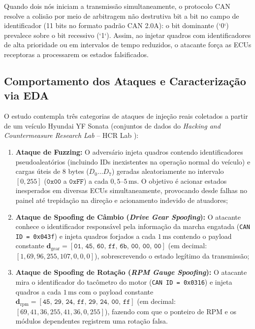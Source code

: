\documentclass[conference]{IEEEtran}
\begin{document}
Quando dois nós iniciam a transmissão simultaneamente, o protocolo CAN resolve a colisão por meio de arbitragem não destrutiva bit a bit no campo de identificador (11 bits no formato padrão CAN 2.0A): o bit dominante (`0`) prevalece sobre o bit recessivo (`1`). Assim, ao injetar quadros com identificadores de alta prioridade ou em intervalos de tempo reduzidos, o atacante força as ECUs receptoras a processarem os estados falsificados.

\subsection{Comportamento dos Ataques e Caracterização via EDA}
O estudo contempla três categorias de ataques de injeção reais coletados a partir de um veículo Hyundai YF Sonata (conjuntos de dados do \textit{Hacking and Countermeasure Research Lab} -- HCR Lab \cite{seo2018gids}):

\begin{enumerate}
    \item \textbf{Ataque de Fuzzing:} O adversário injeta quadros contendo identificadores pseudoaleatórios (incluindo IDs inexistentes na operação normal do veículo) e cargas úteis de 8 bytes ($D_0 \dots D_7$) geradas aleatoriamente no intervalo $[0, 255]$ ($\texttt{0x00}$ a $\texttt{0xFF}$) a cada $0{,}5\text{--}5\,\text{ms}$. O objetivo é acionar estados inesperados em diversas ECUs simultaneamente, provocando desde falhas no painel até trepidação na direção e acionamento indevido de atuadores;
    \item \textbf{Ataque de Spoofing de Câmbio (\textit{Drive Gear Spoofing}):} O atacante conhece o identificador responsável pela informação da marcha engatada (\texttt{CAN ID = 0x043f}) e injeta quadros forjados a cada $1\,\text{ms}$ contendo o payload constante $\mathbf{d}_{\text{gear}} = [\texttt{01, 45, 60, ff, 6b, 00, 00, 00}]$ (em decimal: $[1, 69, 96, 255, 107, 0, 0, 0]$), sobrescrevendo o estado legítimo da transmissão;
    \item \textbf{Ataque de Spoofing de Rotação (\textit{RPM Gauge Spoofing}):} O atacante mira o identificador do tacômetro do motor (\texttt{CAN ID = 0x0316}) e injeta quadros a cada $1\,\text{ms}$ com o payload constante $\mathbf{d}_{\text{rpm}} = [\texttt{45, 29, 24, ff, 29, 24, 00, ff}]$ (em decimal: $[69, 41, 36, 255, 41, 36, 0, 255]$), fazendo com que o ponteiro de RPM e os módulos dependentes registrem uma rotação falsa.
\end{enumerate}
\end{document}
